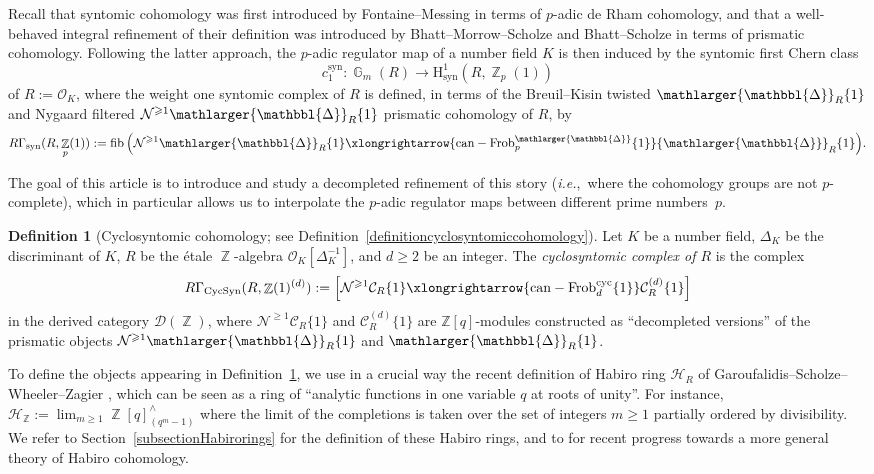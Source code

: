 \documentclass[10pt,twoside]{scrarticle}
\theoremstyle{definition}
\newtheorem{definition}[theorem]{Definition}
\DeclareMathOperator{\Z}{\mathbb{Z}}
\DeclareMathOperator{\G}{\mathbb{G}}
\newcommand{\nbrrg}{\mathcal{O}_K[\Delta_K^{-1}]}
\newcommand{\CR}{\mathcal{C}_{R}}
\newcommand{\can}{\text{can}}
\newcommand{\Frob}{\mathrm{Frob}}
\newcommand{\Cyc}{\mathrm{cyc}}
\newcommand{\CycSyn}{\mathrm{CycSyn}}
\renewcommand{\ge}{\geqslant}
\newcommand{\fib}{\operatorname{fib}}
\newcommand{\Prism}{{\mathlarger{\mathbbl{\Delta}}}}
\numberwithin{equation}{theorem}
\begin{document}
    Recall that syntomic cohomology was first introduced by Fontaine--Messing \cite{fontaine_p-adic_1987} in terms of $p$-adic de Rham cohomology, and that a well-behaved integral refinement of their definition was introduced by Bhatt--Morrow--Scholze \cite{bhatt_topological_2019} and Bhatt--Scholze \cite{bhatt_prisms_2022} in terms of prismatic cohomology. Following the latter approach, the $p$-adic regulator map of a number field $K$ is then induced by the syntomic first Chern class
    $$c_1^{\text{syn}} : \G_m(R) \longrightarrow \text{H}^1_{\text{syn}}(R,\Z_p(1))$$
    of $R:=\mathcal{O}_K$, where the weight one syntomic complex of $R$ is defined, in terms of the Breuil--Kisin twisted $\Prism_R\{1\}$ and Nygaard filtered $\mathcal{N}^{\ge 1} \Prism_R\{1\}$ prismatic cohomology of $R$, by
    $$R\Gamma_{\text{syn}}(R,\Z_p(1)) := \fib\Big(\mathcal{N}^{\ge 1} \Prism_R \{1\} \xlongrightarrow{\can - \Frob_p^{\Prism}\{1\}} \Prism_R \{1\}\Big).$$

    The goal of this article is to introduce and study a decompleted refinement of this story (\emph{i.e.},~where the cohomology groups are not $p$-complete), which in particular allows us to interpolate the $p$-adic regulator maps between different prime numbers~$p$.
    

    

    \begin{definition}[Cyclosyntomic cohomology; see Definition~\ref{definitioncyclosyntomiccohomology}]\label{definitionintrocyclosyntomiccohomology}
        Let $K$ be a number field, $\Delta_K$ be the discriminant of $K$, $R$ be the étale $\Z$-algebra $\nbrrg$, and $d \ge 2$ be an integer. The \emph{cyclosyntomic complex of $R$} is the complex
        $$R\Gamma_{\CycSyn}(R,\Z(1)^{(d)}) := \left[ \mathcal{N}^{\ge 1} \mathcal{C}_R\{1\} \xlongrightarrow{\can - \Frob^{\Cyc}_d\{1\}} \mathcal{C}_R^{(d)}\{1\} \right]$$
        in the derived category $\mathcal{D}(\Z)$, where $\mathcal{N}^{\ge 1} \CR\{1\}$ and $\mathcal{C}_{R}^{(d)}\{1\}$ are $\mathbb{Z}[q]$-modules constructed as ``decompleted versions'' of the prismatic objects $\mathcal{N}^{\ge 1} \Prism_R \{1\}$ and $\Prism_R\{1\}$. 
    \end{definition}

    To define the objects appearing in Definition~\ref{definitionintrocyclosyntomiccohomology}, we use in a crucial way the recent definition of Habiro ring $\mathcal{H}_R$ of Garoufalidis--Scholze--Wheeler--Zagier \cite{garoufalidis_habiro_2024}, which can be seen as a ring of ``analytic functions in one variable $q$ at roots of unity''. For instance, $\mathcal{H}_{\Z} := \lim_{m \ge 1} \Z[q]^\wedge_{(q^m-1)}$ where the limit of the completions is taken over the set of integers $m \ge 1$ partially ordered by divisibility.  
    We refer to Section~\ref{subsectionHabirorings} for the definition of these Habiro rings, and to \cite{scholze_habiro_2025,wagner_q-hodge_2025,garoufalidis_explicit_2025} for recent progress towards a more general theory of Habiro cohomology. 
    
\end{document}

